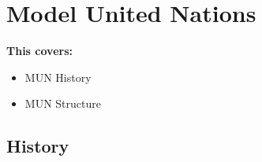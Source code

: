 \chapter{Model United Nations}
\begin{shaded}
  \textbf{This covers:}
    \begin{itemize}
      \item MUN History
      \item MUN Structure
    \end{itemize}
\end{shaded}
\section{History}
